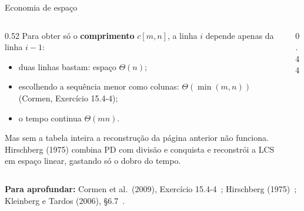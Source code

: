 \documentclass[aspectratio=169,xcolor=table]{beamer}
\newcommand{\fonte}[1]{%
  \vfill
  {\tiny\color{gray!55!black}\textbf{Para aprofundar:} #1\par}%
}
\begin{document}
\begin{frame}{Economia de espaço}
  \begin{columns}[c]
    \begin{column}{0.52\textwidth}
      \scriptsize Para obter só o \textbf{comprimento} $c[m,n]$, a linha $i$ depende apenas da
      linha $i-1$:
      \begin{itemize}\scriptsize
        \item duas linhas bastam: espaço $\Theta(n)$;
        \item escolhendo a sequência menor como colunas: $\Theta(\min(m,n))$
              (Cormen, Exercício 15.4-4);
        \item o tempo continua $\Theta(mn)$.
      \end{itemize}
      Mas sem a tabela inteira a reconstrução da página anterior não funciona. Hirschberg
      (1975) combina PD com divisão e conquista e reconstrói a LCS em espaço linear,
      gastando só o dobro do tempo.
    \end{column}
    \begin{column}{0.44\textwidth}
      \centering
    \end{column}
  \end{columns}
  \fonte{Cormen et al.\ (2009), Exercício 15.4-4~\cite{cormen2009introduction};
    Hirschberg (1975)~\cite{hirschberg1975linear}; Kleinberg e Tardos (2006),
    \S 6.7~\cite{kleinberg2006algorithm}.}
\end{frame}
\end{document}
